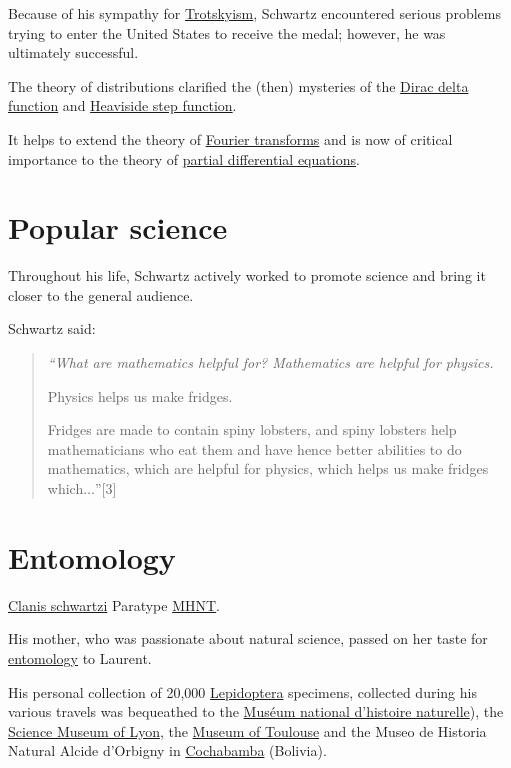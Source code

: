 \documentclass{book}
\numberwithin{equation}{section}
\begin{document}
Because of his sympathy for \href{https://en.wikipedia.org/wiki/Trotskyism}{Trotskyism}, Schwartz encountered serious problems trying to enter the United States to receive the medal; however, he was ultimately successful.

%
The theory of distributions clarified the (then) mysteries of the \href{https://en.wikipedia.org/wiki/Dirac_delta_function}{Dirac delta function} and \href{https://en.wikipedia.org/wiki/Heaviside_step_function}{Heaviside step function}.

It helps to extend the theory of \href{https://en.wikipedia.org/wiki/Fourier_transform}{Fourier transforms} and is now of critical importance to the theory of \href{https://en.wikipedia.org/wiki/Partial_differential_equation}{partial differential equations}.

\section{Popular science}
Throughout his life, Schwartz actively worked to promote science and bring it closer to the general audience.

Schwartz said:
\begin{quotation}\it
    ``What are mathematics helpful for? Mathematics are helpful for physics.
    
    Physics helps us make fridges.
    
    Fridges are made to contain spiny lobsters, and spiny lobsters help mathematicians who eat them and have hence better abilities to do mathematics, which are helpful for physics, which helps us make fridges which$\ldots$''[3]
\end{quotation}

\section{Entomology}
\textsf{\href{https://en.wikipedia.org/wiki/Clanis_schwartzi}{Clanis schwartzi} Paratype \href{https://en.wikipedia.org/wiki/MHNT}{MHNT}.}

His mother, who was passionate about natural science, passed on her taste for \href{https://en.wikipedia.org/wiki/Entomology}{entomology} to Laurent.

His personal collection of 20,000 \href{https://en.wikipedia.org/wiki/Lepidoptera}{Lepidoptera} specimens, collected during his various travels was bequeathed to the \href{https://en.wikipedia.org/wiki/National_Museum_of_Natural_History_(France)}{Muséum national d'histoire naturelle}), the \href{https://en.wikipedia.org/wiki/Mus%C3%A9e_des_Confluences}{Science Museum of Lyon}, the \href{https://en.wikipedia.org/wiki/Mus%C3%A9um_de_Toulouse}{Museum of Toulouse} and the Museo de Historia Natural Alcide d'Orbigny in \href{https://en.wikipedia.org/wiki/Cochabamba}{Cochabamba} (Bolivia).
    
\end{document}
